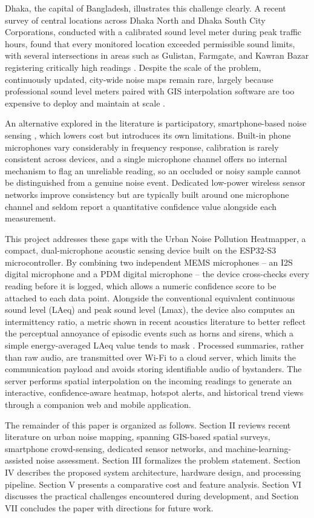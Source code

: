 \documentclass[conference]{IEEEtran}
\begin{document}
Dhaka, the capital of Bangladesh, illustrates this challenge clearly. A recent survey of central locations across Dhaka North and Dhaka South City Corporations, conducted with a calibrated sound level meter during peak traffic hours, found that every monitored location exceeded permissible sound limits, with several intersections in areas such as Gulistan, Farmgate, and Kawran Bazar registering critically high readings \cite{b4}. Despite the scale of the problem, continuously updated, city-wide noise maps remain rare, largely because professional sound level meters paired with GIS interpolation software are too expensive to deploy and maintain at scale \cite{b2}.

An alternative explored in the literature is participatory, smartphone-based noise sensing \cite{b5}, which lowers cost but introduces its own limitations. Built-in phone microphones vary considerably in frequency response, calibration is rarely consistent across devices, and a single microphone channel offers no internal mechanism to flag an unreliable reading, so an occluded or noisy sample cannot be distinguished from a genuine noise event. Dedicated low-power wireless sensor networks improve consistency \cite{b6} but are typically built around one microphone channel and seldom report a quantitative confidence value alongside each measurement.

This project addresses these gaps with the Urban Noise Pollution Heatmapper, a compact, dual-microphone acoustic sensing device built on the ESP32-S3 microcontroller. By combining two independent MEMS microphones -- an I2S digital microphone and a PDM digital microphone -- the device cross-checks every reading before it is logged, which allows a numeric confidence score to be attached to each data point. Alongside the conventional equivalent continuous sound level (LAeq) and peak sound level (Lmax), the device also computes an intermittency ratio, a metric shown in recent acoustics literature to better reflect the perceptual annoyance of episodic events such as horns and sirens, which a simple energy-averaged LAeq value tends to mask \cite{b3}. Processed summaries, rather than raw audio, are transmitted over Wi-Fi to a cloud server, which limits the communication payload and avoids storing identifiable audio of bystanders. The server performs spatial interpolation on the incoming readings to generate an interactive, confidence-aware heatmap, hotspot alerts, and historical trend views through a companion web and mobile application.

The remainder of this paper is organized as follows. Section II reviews recent literature on urban noise mapping, spanning GIS-based spatial surveys, smartphone crowd-sensing, dedicated sensor networks, and machine-learning-assisted noise assessment. Section III formalizes the problem statement. Section IV describes the proposed system architecture, hardware design, and processing pipeline. Section V presents a comparative cost and feature analysis. Section VI discusses the practical challenges encountered during development, and Section VII concludes the paper with directions for future work.
\end{document}
